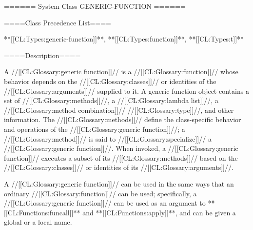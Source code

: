 ====== System Class GENERIC-FUNCTION ======

====Class Precedence List====

**[[CL:Types:generic-function]]**, **[[CL:Types:function]]**, **[[CL:Types:t]]**

====Description====

A //[[CL:Glossary:generic function]]// is a //[[CL:Glossary:function]]// whose behavior depends on the //[[CL:Glossary:classes]]// or identities of the //[[CL:Glossary:arguments]]// supplied to it. A generic function object contains a set of //[[CL:Glossary:methods]]//, a //[[CL:Glossary:lambda list]]//, a //[[CL:Glossary:method combination]]// //[[CL:Glossary:type]]//, and other information. The //[[CL:Glossary:methods]]// define the class-specific behavior and operations of the //[[CL:Glossary:generic function]]//; a //[[CL:Glossary:method]]// is said to //[[CL:Glossary:specialize]]// a //[[CL:Glossary:generic function]]//. When invoked, a //[[CL:Glossary:generic function]]// executes a subset of its //[[CL:Glossary:methods]]// based on the //[[CL:Glossary:classes]]// or identities of its //[[CL:Glossary:arguments]]//.

A //[[CL:Glossary:generic function]]// can be used in the same ways that an ordinary //[[CL:Glossary:function]]// can be used; specifically, a //[[CL:Glossary:generic function]]// can be used as an argument to **[[CL:Functions:funcall]]** and **[[CL:Functions:apply]]**, and can be given a global or a local name.

